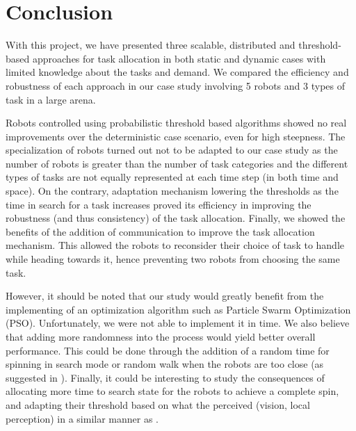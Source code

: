 \section{Conclusion}
With this project, we have presented three scalable, distributed and threshold-based approaches for task allocation in both static and dynamic cases with limited knowledge about the tasks and demand. We compared the efficiency and robustness of each approach in our case study involving 5 robots and 3 types of task in a large arena.

Robots controlled using probabilistic threshold based algorithms showed no real improvements over the deterministic case scenario, even for high steepness. The specialization of robots turned out not to be adapted to our case study as the number of robots is greater than the number of task categories and the different types of tasks are not equally represented at each time step (in both time and space). On the contrary, adaptation mechanism lowering the thresholds as the time in search for a task increases proved its efficiency in improving the robustness (and thus consistency) of the task allocation. Finally, we showed the benefits of the addition of communication to improve the task allocation mechanism. This allowed the robots to reconsider their choice of task to handle while heading towards it, hence preventing two robots from choosing the same task.

However, it should be noted that our study would greatly benefit from the implementing of an optimization algorithm such as Particle Swarm Optimization (PSO). Unfortunately, we were not able to implement it in time. We also believe that adding more randomness into the process would yield better overall performance. This could be done through the addition of a random time for spinning in search mode or random walk when the robots are too close (as suggested in \cite{3}). Finally, it could be interesting to study the consequences of allocating more time to search state for the robots to achieve a complete spin, and adapting their threshold based on what the perceived (vision, local perception) in a similar manner as \cite{3}.

